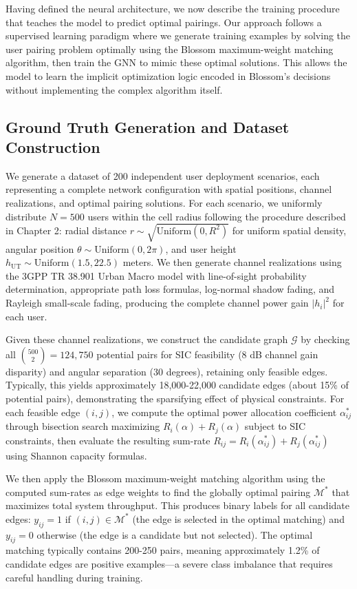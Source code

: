 Having defined the neural architecture, we now describe the training procedure that teaches the model to predict optimal pairings. Our approach follows a supervised learning paradigm where we generate training examples by solving the user pairing problem optimally using the Blossom maximum-weight matching algorithm, then train the GNN to mimic these optimal solutions. This allows the model to learn the implicit optimization logic encoded in Blossom's decisions without implementing the complex algorithm itself.

\subsection{Ground Truth Generation and Dataset Construction}

We generate a dataset of 200 independent user deployment scenarios, each representing a complete network configuration with spatial positions, channel realizations, and optimal pairing solutions. For each scenario, we uniformly distribute $N=500$ users within the cell radius following the procedure described in Chapter 2: radial distance $r \sim \sqrt{\text{Uniform}(0, R^2)}$ for uniform spatial density, angular position $\theta \sim \text{Uniform}(0, 2\pi)$, and user height $h_{\text{UT}} \sim \text{Uniform}(1.5, 22.5)$ meters. We then generate channel realizations using the 3GPP TR 38.901 Urban Macro model with line-of-sight probability determination, appropriate path loss formulas, log-normal shadow fading, and Rayleigh small-scale fading, producing the complete channel power gain $|h_i|^2$ for each user.

Given these channel realizations, we construct the candidate graph $\mathcal{G}$ by checking all $\binom{500}{2} = 124,750$ potential pairs for SIC feasibility (8 dB channel gain disparity) and angular separation (30 degrees), retaining only feasible edges. Typically, this yields approximately 18,000-22,000 candidate edges (about 15\% of potential pairs), demonstrating the sparsifying effect of physical constraints. For each feasible edge $(i,j)$, we compute the optimal power allocation coefficient $\alpha_{ij}^*$ through bisection search maximizing $R_i(\alpha) + R_j(\alpha)$ subject to SIC constraints, then evaluate the resulting sum-rate $R_{ij} = R_i(\alpha_{ij}^*) + R_j(\alpha_{ij}^*)$ using Shannon capacity formulas.

We then apply the Blossom maximum-weight matching algorithm using the computed sum-rates as edge weights to find the globally optimal pairing $\mathcal{M}^*$ that maximizes total system throughput. This produces binary labels for all candidate edges: $y_{ij} = 1$ if $(i,j) \in \mathcal{M}^*$ (the edge is selected in the optimal matching) and $y_{ij} = 0$ otherwise (the edge is a candidate but not selected). The optimal matching typically contains 200-250 pairs, meaning approximately 1.2\% of candidate edges are positive examples—a severe class imbalance that requires careful handling during training.

